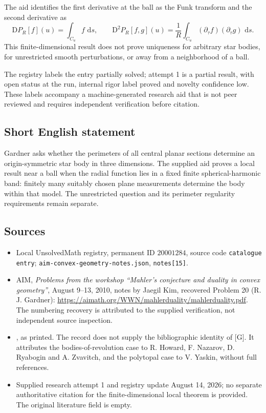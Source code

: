 \documentclass[11pt]{article}
\newcommand{\dd}{\,\mathrm{d}}
\begin{document}
The aid identifies the first derivative at the ball as the Funk transform and the second derivative as
\[
\mathrm DP_R[f](u)=\int_{C_u}f\,\dd s,\qquad
\mathrm D^2P_R[f,g](u)=\frac1R\int_{C_u}(\partial_\tau f)(\partial_\tau g)\,\dd s.
\]
This finite-dimensional result does not prove uniqueness for arbitrary star bodies, for unrestricted smooth perturbations, or away from a neighborhood of a ball.

The registry labels the entry partially solved; attempt 1 is a partial result, with open status at the run, internal rigor label proved and novelty confidence low. These labels accompany a machine-generated research aid that is not peer reviewed and requires independent verification before citation.
\subsection{Short English statement}
Gardner asks whether the perimeters of all central planar sections determine an origin-symmetric star body in three dimensions. The supplied aid proves a local result near a ball when the radial function lies in a fixed finite spherical-harmonic band: finitely many suitably chosen plane measurements determine the body within that model. The unrestricted question and its perimeter regularity requirements remain separate.
\subsection{Sources}
\begin{itemize}
\item Local UnsolvedMath registry, permanent ID \(20001284\), source code \texttt{catalogue entry}; \texttt{aim-convex-geometry-notes.json}, \texttt{notes[15]}.
\item AIM, \emph{Problems from the workshop ``Mahler's conjecture and duality in convex geometry''}, August 9--13, 2010, notes by Jaegil Kim, recovered Problem 20 (R. J. Gardner): \url{https://aimath.org/WWN/mahlerduality/mahlerduality.pdf}. The numbering recovery is attributed to the supplied verification, not independent source inspection.
\item [G, Problem 7.6], as printed. The record does not supply the bibliographic identity of [G]. It attributes the bodies-of-revolution case to R. Howard, F. Nazarov, D. Ryabogin and A. Zvavitch, and the polytopal case to V. Yaskin, without full references.
\item Supplied research attempt 1 and registry update August 14, 2026; no separate authoritative citation for the finite-dimensional local theorem is provided. The original literature field is empty.
\end{itemize}
\end{document}
